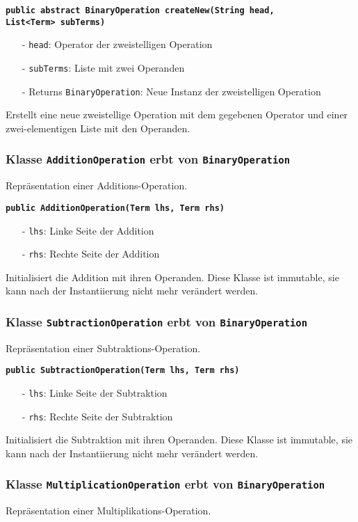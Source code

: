 \documentclass[parskip=full,11pt,twoside]{scrartcl}
\begin{document}
\textbf{\texttt{public abstract BinaryOperation createNew(String head,\\List<Term> subTerms)}}
\begin{itemize}[noitemsep]
	\item[-] \texttt{head}: Operator der zweistelligen Operation
	\item[-] \texttt{subTerms}: Liste mit zwei Operanden
	\item[-] Returns \texttt{BinaryOperation}: Neue Instanz der zweistelligen Operation
\end{itemize}
Erstellt eine neue zweistellige Operation mit dem gegebenen Operator und einer zwei-elementigen Liste mit den Operanden.

\subsubsection{Klasse \texttt{AdditionOperation} erbt von \texttt{BinaryOperation}}
Repräsentation einer Additions-Operation.

\textbf{\texttt{public AdditionOperation(Term lhs, Term rhs)}}
\begin{itemize}[noitemsep]
	\item[-] \texttt{lhs}: Linke Seite der Addition
	\item[-] \texttt{rhs}: Rechte Seite der Addition
\end{itemize}
Initialisiert die Addition mit ihren Operanden. Diese Klasse ist immutable, sie kann nach der Instantiierung nicht mehr verändert werden.

\subsubsection{Klasse \texttt{SubtractionOperation} erbt von \texttt{BinaryOperation}}
Repräsentation einer Subtraktions-Operation.

\textbf{\texttt{public SubtractionOperation(Term lhs, Term rhs)}}
\begin{itemize}[noitemsep]
	\item[-] \texttt{lhs}: Linke Seite der Subtraktion
	\item[-] \texttt{rhs}: Rechte Seite der Subtraktion
\end{itemize}
Initialisiert die Subtraktion mit ihren Operanden. Diese Klasse ist immutable, sie kann nach der Instantiierung nicht mehr verändert werden.

\subsubsection{Klasse \texttt{MultiplicationOperation} erbt von \texttt{BinaryOperation}}
Repräsentation einer Multiplikations-Operation.
\end{document}
